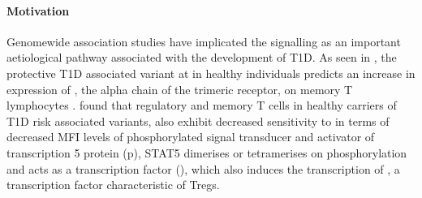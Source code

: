 \paragraph{Motivation}
Genomewide association studies have implicated the  signalling as an important aetiological pathway associated with the development of \gls{T1D}.  
As seen in , the protective T1D associated  variant at  in healthy individuals predicts an increase in expression of ,
the alpha chain of the trimeric  receptor, on memory \positive T lymphocytes \citep{Dendrou:2008gc,Dendrou:2009dv}.
\citet{Garg:2012jr} found that regulatory and memory \positive T cells in healthy carriers of T1D risk associated  variants,
also exhibit decreased sensitivity to  in terms of decreased MFI levels of
phosphorylated signal transducer and activator of transcription 5 protein (p),
STAT5 dimerises or tetramerises on phosphorylation and acts as a transcription factor (),
which also induces the transcription of , a transcription factor characteristic of \glspl{Treg}.

